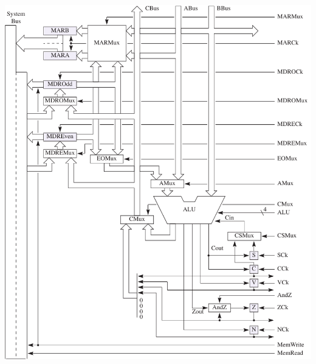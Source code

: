 \documentclass[10pt,fleqn]{book}
\begin{document}
\begin{center}
\includegraphics{pep9cpudatabus.pdf}
\end{center}
\end{document}
